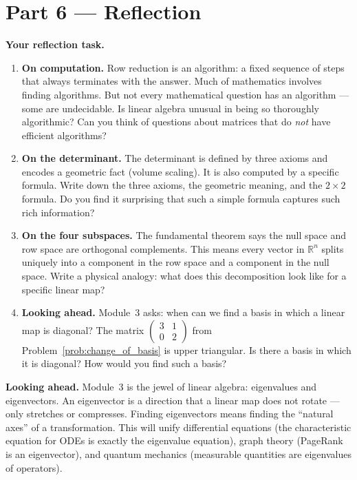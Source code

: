 \documentclass[12pt, a4paper]{article}
\begin{document}
\section{Part 6 \texorpdfstring{---}{--} Reflection}

\begin{reflectionbox}
\textbf{Your reflection task.}

\begin{enumerate}
  \item \textbf{On computation.} Row reduction is an algorithm: a fixed sequence of steps that always terminates with the answer. Much of mathematics involves finding algorithms. But not every mathematical question has an algorithm --- some are undecidable. Is linear algebra unusual in being so thoroughly algorithmic? Can you think of questions about matrices that do \emph{not} have efficient algorithms?

  \item \textbf{On the determinant.} The determinant is defined by three axioms and encodes a geometric fact (volume scaling). It is also computed by a specific formula. Write down the three axioms, the geometric meaning, and the $2\times 2$ formula. Do you find it surprising that such a simple formula captures such rich information?

  \item \textbf{On the four subspaces.} The fundamental theorem says the null space and row space are orthogonal complements. This means every vector in $\mathbb{R}^n$ splits uniquely into a component in the row space and a component in the null space. Write a physical analogy: what does this decomposition look like for a specific linear map?

  \item \textbf{Looking ahead.} Module~3 asks: when can we find a basis in which a linear map is diagonal? The matrix $\begin{pmatrix}3&1\\0&2\end{pmatrix}$ from Problem~\ref{prob:change_of_basis} is upper triangular. Is there a basis in which it is diagonal? How would you find such a basis?
\end{enumerate}
\end{reflectionbox}

\medskip
\noindent\textbf{Looking ahead.}
Module~3 is the jewel of linear algebra: eigenvalues and eigenvectors. An eigenvector is a direction that a linear map does not rotate --- only stretches or compresses. Finding eigenvectors means finding the ``natural axes'' of a transformation. This will unify differential equations (the characteristic equation for ODEs is exactly the eigenvalue equation), graph theory (PageRank is an eigenvector), and quantum mechanics (measurable quantities are eigenvalues of operators).
\end{document}
